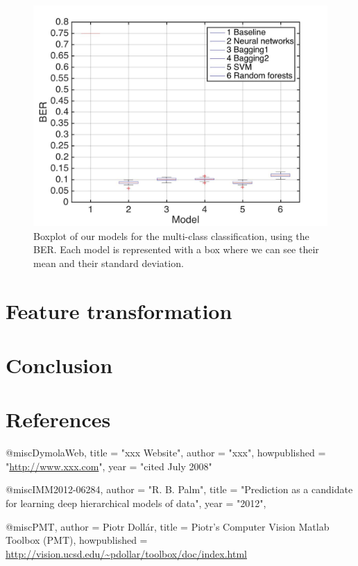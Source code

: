 \documentclass{article} %
\begin{document}
\begin{figure}
\center
\includegraphics[width=5in]{figures/multiclassifications.jpg} 
\caption{Boxplot of our models for the multi-class classification, using the BER. Each model is represented with a box where we can see their mean and their standard deviation.}
\label{fig:models}
\end{figure}

\section{Feature transformation}

\section{Conclusion}

\section{References}

@misc{DymolaWeb,
  title = "xxx Website",
  author = "xxx",
  howpublished = "\url{http://www.xxx.com}",
  year = "cited July 2008"
}

@misc{IMM2012-06284,
    author       = "R. B. Palm",
    title        = "Prediction as a candidate for learning deep hierarchical models of data",
    year         = "2012",
}

@misc{PMT,
   author = {Piotr Doll\'ar}, 
   title = {{P}iotr's {C}omputer {V}ision {M}atlab {T}oolbox ({PMT})}, 
   howpublished = {\url{http://vision.ucsd.edu/~pdollar/toolbox/doc/index.html}} 
} 
\end{document}
